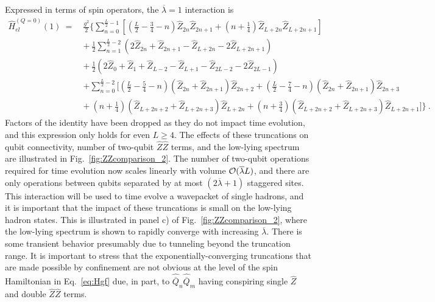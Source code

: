 \documentclass[aps, prc, tightenlines,superscriptaddress, letterpaper, amsmath, amssymb, preprintnumbers, floatfix, longbibliography, nofootinbib]{revtex4-2}
\begin{document}
Expressed in terms of spin operators, the $\overline{\lambda}=1$ interaction is
%
\begin{align}
\hat{H}_{el}^{(Q=0)}(1) 
\ = \ &\frac{g^2}{2}\Bigg\{ \sum_{n=0}^{\frac{L}{2}-1} \left[ \left( \frac{L}{2} - \frac{3}{4} - n \right)\hat{Z}_{2n}\hat{Z}_{2n+1}+\left (n+\frac{1}{4} \right )\hat{Z}_{L+2n}\hat{Z}_{L+2n+1}\right ] 
\nonumber \\
&+ \ \frac{1}{2}
\sum_{n=1}^{\frac{L}{2}-2} \left (2 \hat{Z}_{2n} + \hat{Z}_{2n+1}-\hat{Z}_{L+2n}-2\hat{Z}_{L+2n+1} \right )
\nonumber \\
&+ \ \frac{1}{2}\left (2\hat{Z}_{0}+\hat{Z}_{1}+\hat{Z}_{L-2}-\hat{Z}_{L+1}-\hat{Z}_{2L-2}-2\hat{Z}_{2L-1} \right )  \nonumber \\
&+ \sum_{n=0}^{\frac{L}{2}-2} \bigg[\left (\frac{L}{2}-\frac{5}{4}-n \right )(\hat{Z}_{2n}+\hat{Z}_{2n+1})\hat{Z}_{2n+2} + \left( \frac{L}{2} - \frac{7}{4} - n \right)(\hat{Z}_{2n}+\hat{Z}_{2n+1})\hat{Z}_{2n+3}
\nonumber \\
&+ \  \left (n+\frac{1}{4} \right )(\hat{Z}_{L+2n+2}+\hat{Z}_{L+2n+3})\hat{Z}_{L+2n} +\left (n+\frac{3}{4} \right )(\hat{Z}_{L+2n+2}+\hat{Z}_{L+2n+3})\hat{Z}_{L+2n+1} \bigg] \Bigg\} 
\ .
\label{eq:spatTrun1}
\end{align}
%
Factors of the identity have been dropped as they do not impact time evolution, and this expression only holds for even $L\geq 4$. 
The effects of these truncations on qubit connectivity, number of two-qubit $\hat{Z}\hat{Z}$ terms, and the low-lying spectrum are illustrated in Fig.~\ref{fig:ZZcomparison_2}.
The number of two-qubit operations required for time evolution now scales linearly with volume ${\cal O}(\overline{\lambda} L)$, and there are only operations between qubits separated by at most $(2\overline{\lambda}+1)$ staggered sites.
This interaction will be used to time evolve a wavepacket of single hadrons, and it is important that the impact of these truncations is small on the low-lying hadron states. 
This is illustrated in panel c) of Fig.~\ref{fig:ZZcomparison_2}, where the low-lying spectrum is shown to rapidly converge with increasing $\overline{\lambda}$.
There is some transient behavior presumably due to tunneling beyond the truncation range.
It is important to stress that the exponentially-converging truncations that are made possible by confinement are not obvious at the level of the spin Hamiltonian in Eq.~\eqref{eq:Hgf} due, in part, to $\hat{\overline{Q}}_n \hat{\overline{Q}}_m$ having conspiring single $\hat{Z}$ and double $\hat{Z}\hat{Z}$ terms.
%
\end{document}
